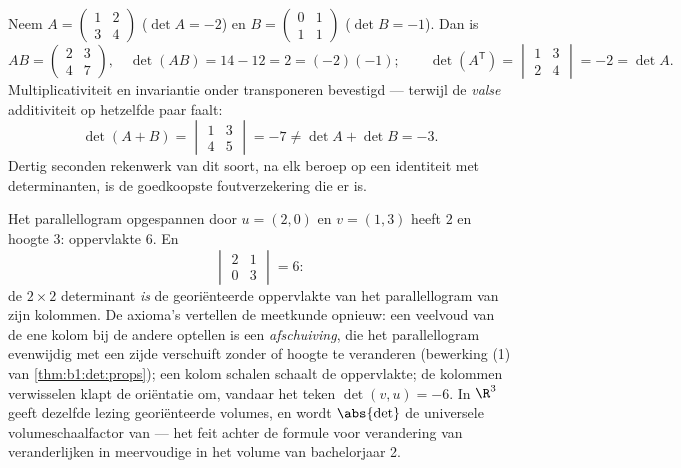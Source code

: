 \begin{example}
\label{ex:b1:det:rulescheck}
Neem $A = \begin{pmatrix} 1 & 2\\ 3 & 4\end{pmatrix}$ ($\det A =
-2$) en $B = \begin{pmatrix} 0 & 1\\ 1 & 1\end{pmatrix}$ ($\det B
= -1$). Dan is
\[
AB = \begin{pmatrix} 2 & 3\\ 4 & 7\end{pmatrix},
\quad \det(AB) = 14 - 12 = 2 = (-2)(-1) ;
\qquad
\det(A^{\mathsf T}) = \begin{vmatrix} 1 & 3\\ 2 & 4
\end{vmatrix} = -2 = \det A .
\]
Multiplicativiteit en invariantie onder transponeren bevestigd ---
terwijl de \emph{valse} additiviteit op hetzelfde paar faalt:
\[
\det(A + B) = \begin{vmatrix} 1 & 3\\ 4 & 5\end{vmatrix} = -7
\neq \det A + \det B = -3 .
\]
Dertig seconden rekenwerk van dit soort, na elk beroep op een
identiteit met determinanten, is de goedkoopste foutverzekering
die er is.
\end{example}

\begin{example}
\label{ex:b1:det:area}
Het parallellogram opgespannen door $u = (2, 0)$ en $v = (1, 3)$
heeft  $2$ en hoogte $3$: oppervlakte $6$. En
\[
\begin{vmatrix} 2 & 1\\ 0 & 3\end{vmatrix} = 6 :
\]
de $2\times2$ determinant \emph{is} de georiënteerde oppervlakte
van het parallellogram van zijn kolommen. De axioma's vertellen de
meetkunde opnieuw: een veelvoud van de ene kolom bij de andere
optellen is een \emph{afschuiving}, die het parallellogram
evenwijdig met een zijde verschuift zonder  of hoogte te
veranderen (bewerking (1) van \cref{thm:b1:det:props}); een kolom
schalen schaalt de oppervlakte; de kolommen verwisselen klapt de
oriëntatie om, vandaar het teken $\det(v, u) = -6$. In $\R^3$ geeft
dezelfde lezing georiënteerde volumes, en wordt $\abs{\det}$ de
universele volumeschaalfactor van  --- het feit
achter de formule voor verandering van veranderlijken in meervoudige
 in het volume van bachelorjaar 2.
\end{example}

